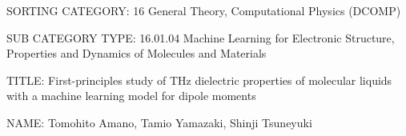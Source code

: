 \documentclass[11pt]{article}
\begin{document}

% 
% 
% 
%
%



SORTING CATEGORY: 16 General Theory, Computational Physics (DCOMP)

SUB CATEGORY TYPE: 16.01.04 Machine Learning for Electronic Structure, Properties and Dynamics of Molecules and Materials

TITLE: First-principles study of THz dielectric properties of molecular liquids with a machine learning model for dipole moments



NAME: Tomohito Amano, Tamio Yamazaki, Shinji Tsuneyuki




\end{document}
